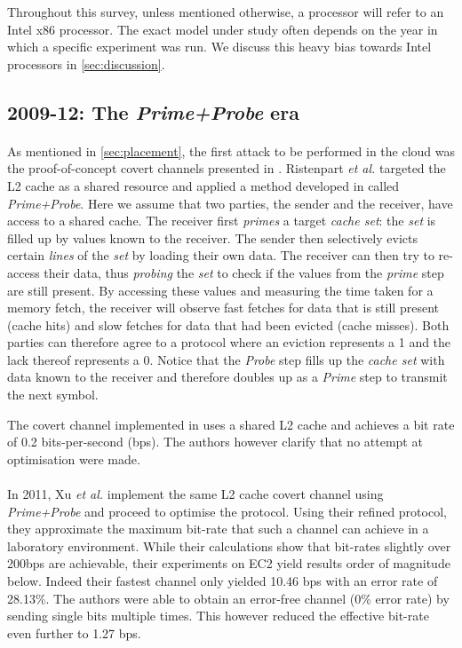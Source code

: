 \documentclass[orivec,envcountsame, a4paper, 11pt]{llncs}
\begin{document}
Throughout this survey, unless mentioned otherwise, a processor will refer to an Intel x86 processor. The exact model under study often depends on the year in which a specific experiment was run. We discuss this heavy bias towards Intel processors in \autoref{sec:discussion}.


\subsection{2009-12: The \textit{Prime+Probe} era}
\label{sec:firstera}

\paragraph{} As mentioned in \autoref{sec:placement}, the first attack to be performed in the cloud was the proof-of-concept covert channels presented in \cite{Ristenpart2009}. Ristenpart \textit{et al.} \cite{Ristenpart2009} targeted the L2 cache as a shared resource and applied a method developed in \cite{Tromer2009} called \textit{Prime+Probe}. Here we assume that two parties, the sender and the receiver, have access to a shared cache. The receiver first \textit{primes} a target \textit{cache set}: the \textit{set} is filled up by values known to the receiver. The sender then selectively evicts certain \textit{lines} of the \textit{set} by loading their own data. The receiver can then try to re-access their data, thus \textit{probing} the \textit{set} to check if the values from the \textit{prime} step are still present. By accessing these values and measuring the time taken for a memory fetch, the receiver will observe fast fetches for data that is still present (cache hits) and slow fetches for data that had been evicted (cache misses). Both parties can therefore agree to a protocol where an eviction represents a 1 and the lack thereof represents a 0. Notice that the \textit{Probe} step fills up the \textit{cache set} with data known to the receiver and therefore doubles up as a \textit{Prime} step to transmit the next symbol.

The covert channel implemented in \cite{Ristenpart2009} uses a shared L2 cache and achieves a bit rate of 0.2 bits-per-second (bps). The authors however clarify that no attempt at optimisation were made.

\paragraph{} In 2011, Xu \textit{et al.} \cite{Xu2011} implement the same L2 cache covert channel using \textit{Prime+Probe} and proceed to optimise the protocol. Using their refined protocol, they approximate the maximum bit-rate that such a channel can achieve in a laboratory environment. While their calculations show that bit-rates slightly over 200bps are achievable, their experiments on EC2 yield results order of magnitude below. Indeed their fastest channel only yielded 10.46 bps with an error rate of 28.13\%. The authors were able to obtain an error-free channel (0\% error rate) by sending single bits multiple times. This however reduced the effective bit-rate even further to 1.27 bps.
\end{document}
